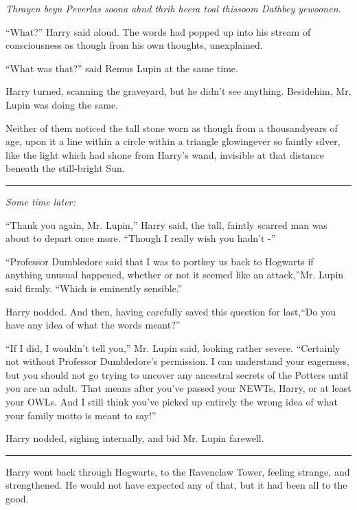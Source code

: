 \emph{Thrayen beyn Peverlas soona ahnd thrih heera toal thissoom Dathbey yewoonen.}

``What?'' Harry said aloud. The words had popped up into his stream of consciousness as though from his own thoughts, unexplained.

``What was that?'' said Remus Lupin at the same time.

Harry turned, scanning the graveyard, but he didn't see anything. Besidehim, Mr. Lupin was doing the same.

Neither of them noticed the tall stone worn as though from a thousandyears of age, upon it a line within a circle within a triangle glowingever so faintly silver, like the light which had shone from Harry's wand, invisible at that distance beneath the still-bright Sun.

\begin{center}\rule{3in}{0.4pt}\end{center}

\emph{Some time later:}

``Thank you again, Mr. Lupin,'' Harry said, the tall, faintly scarred man was about to depart once more. ``Though I really wish you hadn't -''

``Professor Dumbledore said that I was to portkey us back to Hogwarts if anything unusual happened, whether or not it seemed like an attack,''Mr. Lupin said firmly. ``Which is eminently sensible.''

Harry nodded. And then, having carefully saved this question for last,``Do you have any idea of what the words meant?''

``If I did, I wouldn't tell you,'' Mr. Lupin said, looking rather severe. ``Certainly not without Professor Dumbledore's permission. I can understand your eagerness, but you should not go trying to uncover any ancestral secrets of the Potters until you are an adult. That means after you've passed your NEWTs, Harry, or at least your OWLs. And I still think you've picked up entirely the wrong idea of what your family motto is meant to say!''

Harry nodded, sighing internally, and bid Mr. Lupin farewell.

\begin{center}\rule{3in}{0.4pt}\end{center}

Harry went back through Hogwarts, to the Ravenclaw Tower, feeling strange, and strengthened. He would not have expected any of that, but it had been all to the good.

